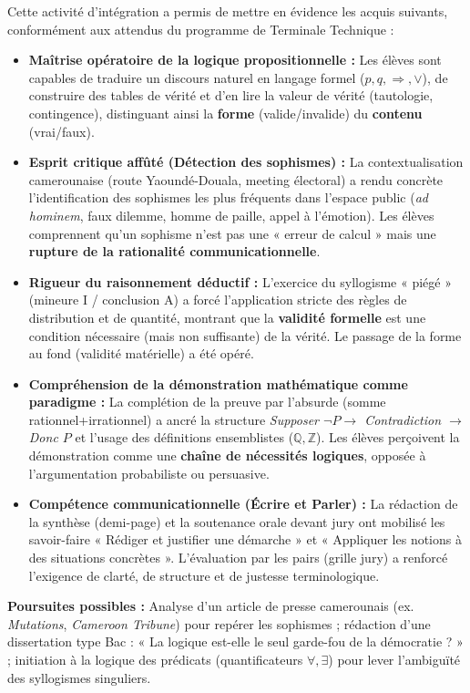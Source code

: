 \documentclass[11pt]{article}
\newcounter{popsec}
\newcounter{popsub}
\newcommand{\courssub}[1]{%
  \stepcounter{popsub}%
  \par\vspace{9pt}\noindent{\popxbold\fontsize{11.5}{13}\selectfont\color{popink}{\color{poporange}\thepopsec.\thepopsub}\hspace{6pt}#1}\par\nopagebreak\vspace{4pt}
}
\begin{document}
\courssub{Bilan de l'activité}
Cette activité d'intégration a permis de mettre en évidence les acquis suivants, conformément aux attendus du programme de Terminale Technique :

\begin{itemize}
    \item \textbf{Maîtrise opératoire de la logique propositionnelle :} Les élèves sont capables de traduire un discours naturel en langage formel ($p, q, \Rightarrow, \lor$), de construire des tables de vérité et d'en lire la valeur de vérité (tautologie, contingence), distinguant ainsi la \textbf{forme} (valide/invalide) du \textbf{contenu} (vrai/faux).
    \item \textbf{Esprit critique affûté (Détection des sophismes) :} La contextualisation camerounaise (route Yaoundé-Douala, meeting électoral) a rendu concrète l'identification des sophismes les plus fréquents dans l'espace public (\emph{ad hominem}, faux dilemme, homme de paille, appel à l'émotion). Les élèves comprennent qu'un sophisme n'est pas une « erreur de calcul » mais une \textbf{rupture de la rationalité communicationnelle}.
    \item \textbf{Rigueur du raisonnement déductif :} L'exercice du syllogisme « piégé » (mineure I / conclusion A) a forcé l'application stricte des règles de distribution et de quantité, montrant que la \textbf{validité formelle} est une condition nécessaire (mais non suffisante) de la vérité. Le passage de la forme au fond (validité matérielle) a été opéré.
    \item \textbf{Compréhension de la démonstration mathématique comme paradigme :} La complétion de la preuve par l'absurde (somme rationnel+irrationnel) a ancré la structure \emph{Supposer $\neg P \rightarrow$ Contradiction $\rightarrow$ Donc $P$} et l'usage des définitions ensemblistes ($\mathbb{Q}, \mathbb{Z}$). Les élèves perçoivent la démonstration comme une \textbf{chaîne de nécessités logiques}, opposée à l'argumentation probabiliste ou persuasive.
    \item \textbf{Compétence communicationnelle (Écrire et Parler) :} La rédaction de la synthèse (demi-page) et la soutenance orale devant jury ont mobilisé les savoir-faire « Rédiger et justifier une démarche » et « Appliquer les notions à des situations concrètes ». L'évaluation par les pairs (grille jury) a renforcé l'exigence de clarté, de structure et de justesse terminologique.
\end{itemize}

\noindent\textbf{Poursuites possibles :} Analyse d'un article de presse camerounais (ex. \emph{Mutations}, \emph{Cameroon Tribune}) pour repérer les sophismes ; rédaction d'une dissertation type Bac : « La logique est-elle le seul garde-fou de la démocratie ? » ; initiation à la logique des prédicats (quantificateurs $\forall, \exists$) pour lever l'ambiguïté des syllogismes singuliers.
\end{document}
